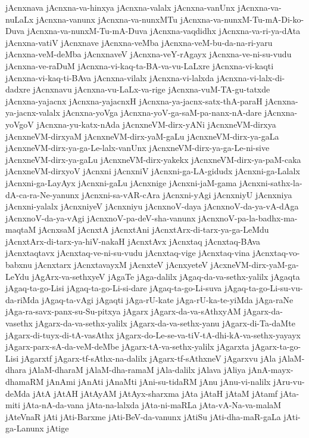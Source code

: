 {jAcnxnava
jAcnxna-va-hinxya
jAcnxna-valalx
jAcnxna-vanUnx
jAcnxna-va-nuLaLx
jAcnxna-vanunx
jAcnxna-va-nunxMTu
jAcnxna-va-nunxM-Tu-mA-Di-ko-Duva
jAcnxna-va-nunxM-Tu-mA-Duva
jAcnxna-vaqdidhx
jAcnxna-va-ri-ya-dAta
jAcnxna-vatiV
jAcnxnave
jAcnxna-veMba
jAcnxna-veM-bu-da-na-ri-yaru
jAcnxna-veM-deMba
jAcnxnaveV
jAcnxna-veY-rAgayx
jAcnxna-ve-ni-su-vudu
jAcnxna-ve-raDuM
jAcnxna-vi-kaq-ta-BA-va-vu-LaLxre
jAcnxna-vi-kaqti
jAcnxna-vi-kaq-ti-BAva
jAcnxna-vilalx
jAcnxna-vi-lalxda
jAcnxna-vi-lalx-di-dadxre
jAcnxnavu
jAcnxna-vu-LaLx-va-rige
jAcnxna-vuM-TA-gu-tatxde
jAcnxna-yajacnx
jAcnxna-yajacnxH
jAcnxna-ya-jacnx-satx-thA-paraH
jAcnxna-ya-jacnx-valalx
jAcnxna-yoVga
jAcnxna-yoV-ga-saM-pa-nanx-nA-dare
jAcnxna-yoVgoV
jAcnxna-yu-katx-nAda
jAcnxneVM-dirx-yANi
jAcnxneVM-dirxya
jAcnxneVM-dirxyaM
jAcnxneVM-dirx-yaM-gaLu
jAcnxneVM-dirx-ya-gaLa
jAcnxneVM-dirx-ya-ga-Le-lalx-vanUnx
jAcnxneVM-dirx-ya-ga-Le-ni-sive
jAcnxneVM-dirx-ya-gaLu
jAcnxneVM-dirx-yakekx
jAcnxneVM-dirx-ya-paM-caka
jAcnxneVM-dirxyoV
jAcnxni
jAcnxniV
jAcnxni-ga-LA-gidudx
jAcnxni-ga-Lalalx
jAcnxni-ga-LayAyx
jAcnxni-gaLu
jAcnxnige
jAcnxni-jaM-gama
jAcnxni-sathx-la-dA-ca-ra-Ne-yanunx
jAcnxni-sa-vAR-cAra
jAcnxni-yAgi
jAcnxniyU
jAcnxniya
jAcnxni-yalalx
jAcnxniyeV
jAcnxniyu
jAcnxnoV-daya
jAcnxnoV-da-ya-vA-dAga
jAcnxnoV-da-ya-vAgi
jAcnxnoV-pa-deV-sha-vanunx
jAcnxnoV-pa-la-badhx-ma-maqtaM
jAcnxsaM
jAcnxtA
jAcnxtAni
jAcnxtArx-di-tarx-ya-ga-LeMdu
jAcnxtArx-di-tarx-ya-hiV-nakaH
jAcnxtAvx
jAcnxtaq
jAcnxtaq-BAva
jAcnxtaqtavx
jAcnxtaq-ve-ni-su-vudu
jAcnxtaq-vige
jAcnxtaq-vina
jAcnxtaq-vo-babxnu
jAcnxtarx
jAcnxtavayxM
jAcnxteV
jAcnxyeteV
jAcxneVM-dirx-yaM-ga-LeYdu
jAgArx-va-sethxyeV
jAgaTe
jAga-dalilx
jAgaq-da-va-sethx-yalilx
jAgaqta
jAgaq-ta-go-Lisi
jAgaq-ta-go-Li-si-dare
jAgaq-ta-go-Li-suva
jAgaq-ta-go-Li-su-vu-da-riMda
jAgaq-ta-vAgi
jAgaqti
jAga-rU-kate
jAga-rU-ka-te-yiMda
jAga-raNe
jAga-ra-savx-panx-su-Su-pitxya
jAgarx
jAgarx-da-va-sAthxyAM
jAgarx-da-vasethx
jAgarx-da-va-sethx-yalilx
jAgarx-da-va-sethx-yanu
jAgarx-di-Ta-daMte
jAgarx-di-tuyx-di-tA-vasAthx
jAgarx-do-Le-se-va-tiV-tA-dhi-kA-va-sethx-yayayx
jAgarx-parx-sA-da-veM-deMbe
jAgarx-tA-va-sethx-yalilx
jAgarxta
jAgarx-ta-go-Lisi
jAgarxtf
jAgarx-tf-sAthx-na-dalilx
jAgarx-tf-sAthxneV
jAgarxvu
jAla
jAlaM-dhara
jAlaM-dharaM
jAlaM-dha-ramaM
jAla-dalilx
jAlava
jAliya
jAnA-mayx-dhamaRM
jAnAmi
jAnAti
jAnaMti
jAni-su-tidaRM
jAnu
jAnu-vi-nalilx
jAru-vu-deMda
jAtA
jAtAH
jAtAyAM
jAtAyx-sharxma
jAta
jAtaH
jAtaM
jAtamf
jAta-miti
jAta-nA-da-vana
jAta-na-lalxda
jAta-ni-maRLa
jAta-vA-Na-va-malaM
jAteVnaR
jAti
jAti-Barxme
jAti-BeV-da-vanunx
jAtiSu
jAti-dha-maR-gaLa
jAti-ga-Lanunx
jAtige
}
